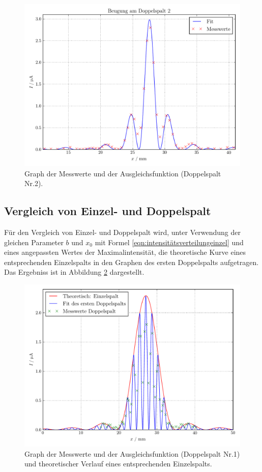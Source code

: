 \documentclass[
  bibliography=totoc,     %
  captions=tableheading,  %
  titlepage=firstiscover, %
]{scrartcl}
\begin{document}
\begin{figure}
  \centering
  \includegraphics[width=\textwidth]{Plot3.pdf}
  \caption{Graph der Messwerte und der Ausgleichsfunktion (Doppelspalt Nr.2).}
  \label{fig:plot3}
\end{figure}
\subsection{Vergleich von Einzel- und Doppelspalt}
Für den Vergleich von Einzel- und Doppelspalt wird, unter Verwendung der
gleichen Parameter $b$ und $x_0$ mit Formel
\eqref{eqn:intensitätsverteilungeinzel} und eines angepassten Wertes der
Maximalintensität, die theoretische Kurve eines entsprechenden Einzelspalts
in den Graphen des ersten Doppelspalts aufgetragen.
Das Ergebniss ist in Abbildung \ref{fig:plot4} dargestellt.
\begin{figure}
  \centering
  \includegraphics[width=\textwidth]{Plot4.pdf}
  \caption{Graph der Messwerte und der Ausgleichsfunktion (Doppelspalt Nr.1) und theoretischer Verlauf eines entsprechenden Einzelspalts.}
  \label{fig:plot4}
\end{figure}
\end{document}
